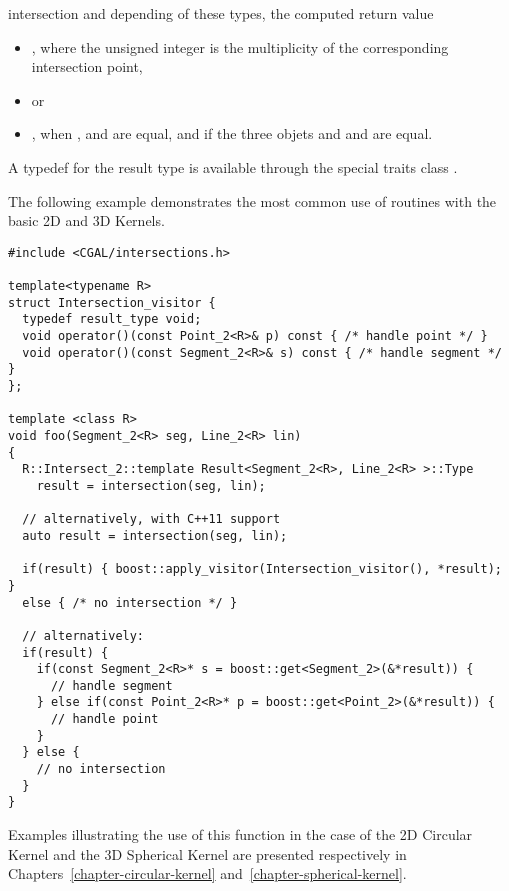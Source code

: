 \begin{ccRefFunction}{intersection}
and depending of these types, the computed return value
\begin{itemize}
\item {} ,
where the unsigned integer is the multiplicity of the corresponding
intersection point,
\item {}  or
\item {} , when ,  and 
 are equal, and if the three objets  and  
and  are equal.
\end{itemize} 

A typedef for the result type is available through the special traits class
. 

\ccExample

The following example demonstrates the most common use of 
 routines with the basic 2D and 3D Kernels.
\ccHtmlLinksOff%
\begin{verbatim}
#include <CGAL/intersections.h>

template<typename R>
struct Intersection_visitor {
  typedef result_type void;
  void operator()(const Point_2<R>& p) const { /* handle point */ }
  void operator()(const Segment_2<R>& s) const { /* handle segment */ }
};

template <class R>
void foo(Segment_2<R> seg, Line_2<R> lin)
{
  R::Intersect_2::template Result<Segment_2<R>, Line_2<R> >::Type 
    result = intersection(seg, lin);

  // alternatively, with C++11 support
  auto result = intersection(seg, lin);

  if(result) { boost::apply_visitor(Intersection_visitor(), *result); } 
  else { /* no intersection */ }

  // alternatively:
  if(result) {
    if(const Segment_2<R>* s = boost::get<Segment_2>(&*result)) {
      // handle segment
    } else if(const Point_2<R>* p = boost::get<Point_2>(&*result)) {
      // handle point
    }
  } else {
    // no intersection
  }
}
\end{verbatim}%
\ccHtmlLinksOn%

Examples illustrating the use of this function in the case of the 2D
Circular Kernel and the 3D Spherical Kernel are presented respectively
in Chapters~\ref{chapter-circular-kernel}
and~\ref{chapter-spherical-kernel}.


\end{ccRefFunction}
